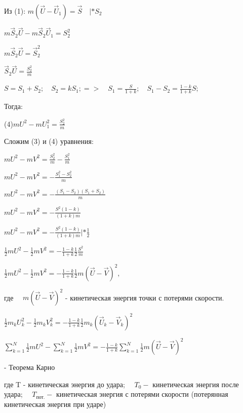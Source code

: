 {\begin{center}
    \par Из (1): $m(\vec{U}-\vec{U}_1)=\vec{S} \quad |*S_2$
    \par $m\vec{S}_2\vec{U}-m\vec{S}_2\vec{U}_1=S_2^{2}$
    \par $m\vec{S}_2\vec{U}=\vec{S}_2^{2}$
    \par $\vec{S}_2\vec{U}=\frac{S_2^{2}}{m}$
    \par $S=S_1+S_2; \quad S_2=kS_1; =>\quad S_1=\frac{S}{1+k}; \quad S_1-S_2=\frac{1-k}{1+k}S;$
    \par Тогда:
    \par (4)$mU^{2}-mU_1^{2}=\frac{S_2^{2}}{m}$
    \par Сложим (3) и (4) уравнения:
    \par $mU^{2}-mV^{2}=\frac{S_2^{2}}{m} - \frac{S_1^{2}}{m}$
    \par $mU^{2}-mV^{2}=-\frac{S_1^{2}-S_2^{2}}{m}$
    \par $mU^{2}-mV^{2}=-\frac{(S_1-S_2)(S_1+S_2)}{m}$
    \par $mU^{2}-mV^{2}=-\frac{S^{2}(1-k)}{(1+k)m}$
    \par $mU^{2}-mV^{2}=-\frac{S^{2}(1-k)}{(1+k)m} |*\frac{1}{2}$ \par $\frac{1}{2}mU^{2}-\frac{1}{2}mV^{2}=-\frac{1-k}{1+k} \frac{1}{2} \frac{S^{2}}{m}$
    \par $\frac{1}{2}mU^{2}-\frac{1}{2}mV^{2}=-\frac{1-k}{1+k} \frac{1}{2} m(\vec{U}-\vec{V})^{2}, $ 
    \par где $\quad m(\vec{U}-\vec{V})^{2}$ - кинетическая энергия точки с потерями скорости.
    \par $\frac{1}{2}m_{k}U_{k}^{2}-\frac{1}{2}m_{k}V_{k}^{2}=-\frac{1-k}{1+k} \frac{1}{2} m_{k}(\vec{U}_{k}-\vec{V}_{k})^{2}$ 
    \par $\sum\limits_{k=1}^N\frac{1}{2}mU^{2}-\sum\limits_{k=1}^N\frac{1}{2}mV^{2}=-\frac{1-k}{1+k}\sum\limits_{k=1}^N \frac{1}{2} m(\vec{U}-\vec{V})^{2}$ 
    \par{}  
    - Теорема Карно
    \par где T - кинетическая энергия до удара; $\quad T_0 -$ кинетическая энергия после удара; $\quad T_\text{пот.} -$ кинетическая энергия с потерями скорости (потерянная кинетическая энергия при ударе)
    \par{}  
\end{center}


}
